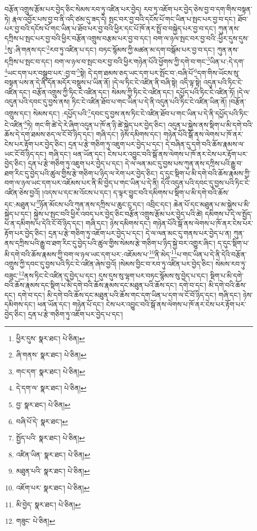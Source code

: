 བརྩོན་འགྲུས་རྩོམ་པར་བྱེད་ཅིང་སེམས་རབ་ཏུ་འཛིན་པར་བྱེད། རབ་ཏུ་འཇོག་པར་བྱེད་ཅེས་བྱ་བ་དག་གིས་བསྟན་ཏེ། རྣལ་འབྱོར་པས་བྱ་བ་ནི་འདི་ཙམ་དུ་ཟད་དེ། སྤང་བར་བྱ་བའི་དངོས་པོ་གང་ཡིན་པ་སྤང་པར་བྱ་བ་དང་། ཐོབ་པར་བྱ་བའི་དངོས་པོ་གང་ཡིན་པ་ཐོབ་པར་བྱ་བའི་ཕྱིར་དང་པོ་ཁོ་ནར་སྤྲོ་བ་བསྐྱེད་པར་བྱ་བ་དང་། ཀུན་ནས་དཀྲིས་པ་སྤང་པར་བྱ་བའི་ཕྱིར་བརྩོན་འགྲུས་བརྩམ་པར་བྱ་བ་དང་། བག་ལ་ཉལ་སྤང་བར་བྱ་བའི་:ཕྱིར་དུས་དུས་\footnote{ཕྱིར་དུས་  སྣར་ཐང་།  པེ་ཅིན། }སུ་:ཞི་གནས་དང་\footnote{ཞི་གནས་  སྣར་ཐང་།  པེ་ཅིན། }རབ་ཏུ་འཛིན་པ་དང་། བཏང་སྙོམས་ཀྱི་མཚན་མ་དག་བསྒོམ་པར་བྱ་བ་དང་། ཀུན་ནས་དཀྲིས་པ་སྤང་བ་དང་། བག་ལ་ཉལ་བ་སྤང་བར་བྱ་བའི་ཕྱིར་གཉེན་པོའི་ཕྱོགས་ཀྱི་དགེ་བ་གང་\footnote{གང་དག་  སྣར་ཐང་།  པེ་ཅིན། }ཡིན་པ་:དེ་དག་\footnote{དེ་དག་ལ་  སྣར་ཐང་།  པེ་ཅིན། }ཡང་དག་པར་བསྒྲུབ་པར་:བྱ་བ་\footnote{བྱ་  སྣར་ཐང་།  པེ་ཅིན། }སྟེ། དེ་དག་ཐམས་ཅད་ཡང་དག་པར་སྤོང་བ་:བཞི་པོ་\footnote{བཞི་པོ་དེ་  སྣར་ཐང་། }དག་གིས་ཡོངས་སུ་བསྟན་པས་ན་དེ་ནི་དོན་མདོར་བསྡུས་པ་ཡིན་ནོ། །དེ་ལ་ཏིང་ངེ་འཛིན་ནི་བཞི་སྟེ། འདི་ལྟ་སྟེ། འདུན་པའི་ཏིང་ངེ་འཛིན་དང་། བརྩོན་འགྲུས་ཀྱི་ཏིང་ངེ་འཛིན་དང་། སེམས་ཀྱི་ཏིང་ངེ་འཛིན་དང་། དཔྱོད་པའི་ཏིང་ངེ་འཛིན་ཏོ། །དེ་ལ་འདུན་པའི་དབང་དུ་བྱས་ནས། ཏིང་ངེ་འཛིན་ཐོབ་པ་གང་ཡིན་པ་དེ་ནི་འདུན་པའི་ཏིང་ངེ་འཛིན་ཡིན་ནོ། །བརྩོན་འགྲུས་དང་། སེམས་དང་། :དཔྱོད་པའི་\footnote{སྤྱོད་པའི་  སྣར་ཐང་།  པེ་ཅིན། }དབང་དུ་བྱས་ནས་ཏིང་ངེ་འཛིན་ཐོབ་པ་གང་ཡིན་པ་དེ་ནི་དཔྱོད་པའི་ཏིང་ངེ་འཛིན་\footnote{འཛིན་ཡིན་  སྣར་ཐང་།  པེ་ཅིན། }ཏེ། གང་གི་ཚེ་དེ་རེ་ཞིག་འདུན་པ་ཁོ་ན་ཉི་ཚེ་སྐྱེད་པར་བྱེད་ཅིང་། འདུན་པ་སྐྱེས་ནས་སྡིག་པ་མི་དགེ་བའི་ཆོས་དེ་དག་ཐམས་ཅད་ལ་ངོ་བོ་ཉིད་དང་། གཞི་དང་། ཉེས་དམིགས་དང་། གཉེན་པོའི་སྒོ་ནས་ལེགས་པ་ཁོ་ནར་ངེས་པར་རྟོག་པར་བྱེད་ཅིང་། དྲན་པ་རྩེ་གཅིག་ཏུ་འཇུག་པར་བྱེད་པ་དང་། དེ་བཞིན་དུ་དགེ་བའི་ཆོས་རྣམས་ལ་ཡང་ངོ་བོ་ཉིད་དང་། གཞི་དང་། ཕན་ཡོན་དང་། ངེས་པར་འབྱུང་བའི་སྒོ་ནས་ལེགས་པ་ཁོ་ནར་ངེས་པར་རྟོག་པར་བྱེད་ཅིང་། དྲན་པ་རྩེ་གཅིག་ཏུ་འཇུག་པར་བྱེད་པ་དང་། དེ་ལ་ལན་མང་དུ་བྱས་པས་ཀུན་ནས་དཀྲིས་པའི་རྒྱུ་བ་ཐག་རིང་དུ་བྱེད་པའི་ཚུལ་གྱིས་རྩེ་གཅིག་པ་ཉིད་ལ་རེག་པར་བྱེད་ཅིང་། ད་དུང་སྡིག་པ་མི་དགེ་བའི་ཆོས་རྣམས་ཀྱི་བག་ལ་ཉལ་ཡང་དག་པར་འཇོམས་པར་ནི་མི་བྱེད་པ་གང་ཡིན་པ་དེ་ནི། དེའི་འདུན་པའི་དབང་དུ་བྱས་པའི་ཏིང་ངེ་འཛིན་ཅེས་བྱའོ། །འདས་པ་དང་མ་འོངས་པ་དང་། ད་ལྟར་བྱུང་བའི་དམིགས་པ་སྡིག་པ་མི་དགེ་བའི་ཆོས་དང་:མཐུན་པ་\footnote{མཐུན་པའི་  སྣར་ཐང་།  པེ་ཅིན། }ཉོན་མོངས་པའི་ཀུན་ནས་དཀྲིས་པ་ཆུང་ངུ་དང་། འབྲིང་དང་། ཆེན་པོ་དང་མཐུན་པ་མ་སྐྱེས་པ་མི་སྐྱེད་པ་དང་། སྐྱེས་པ་སྤང་བའི་ཕྱིར་འབད་པར་བྱེད་ཅིང་བརྩོན་འགྲུས་རྩོམ་པར་བྱེད་པའི་ཚེ། དམིགས་པ་དེ་ལ་སྤྱོད་པ་ན་དམིགས་པ་དེའི་ངོ་བོ་ཉིད་དང་། གཞི་དང་། ཉེས་དམིགས་དང་། གཉེན་པོའི་སྒོ་ནས་ལེགས་པ་ཁོ་ནར་ངེས་པར་རྟོག་པར་བྱེད་ཅིང་། དྲན་པ་རྩེ་གཅིག་ཏུ་འཇོག་པར་བྱེད་པ་དང་། དེ་ལ་ལན་མང་དུ་གནས་པར་བྱེད་པ་ན། ཀུན་ནས་དཀྲིས་པའི་རྒྱུ་བ་ཐག་རིང་དུ་བྱེད་པའི་ཚུལ་གྱིས་སེམས་རྩེ་གཅིག་པ་ཉིད་སྐྱེ་བར་འགྱུར་ཞིང་། ད་དུང་སྡིག་པ་མི་དགེ་བའི་ཆོས་རྣམས་ཀྱི་བག་ལ་ཉལ་ཡང་དག་པར་:འཇོམས་པ་\footnote{འཇོག་པར་  སྣར་ཐང་།  པེ་ཅིན། }ནི་མེད་\footnote{མི་བྱེད་  སྣར་ཐང་།  པེ་ཅིན། }པ་གང་ཡིན་པ་དེ་ནི་དེའི་བརྩོན་འགྲུས་ཀྱི་དབང་དུ་བྱས་པའི་ཏིང་ངེ་འཛིན་ཞེས་བྱའོ། །སེམས་བྱིང་བ་རབ་ཏུ་འཛིན་པར་བྱེད་ཅིང་། སེམས་རབ་ཏུ་བཟུང་\footnote{གཟུང་  པེ་ཅིན། }ནས་ཏིང་ངེ་འཛིན་དུ་བྱེད་པ་དང་། དུས་དུས་སུ་ལྷག་པར་བཏང་སྙོམས་སུ་བྱེད་པ་དང་། སྡིག་པ་མི་དགེ་བའི་ཆོས་རྣམས་དང་སྡིག་པ་མི་དགེ་བའི་ཆོས་རྣམས་དང་མཐུན་པའི་ཆོས་དང་། དགེ་བ་དང་། མི་དགེ་བའི་ཆོས་དང་། དགེ་བ་དང་། མི་དགེ་བའི་ཆོས་དང་མཐུན་པའི་ཆོས་གང་དག་ཡིན་པ་དག་ལ་ངོ་བོ་ཉིད་དང་། གཞི་དང་། ཉེས་དམིགས་དང་། ཕན་ཡོན་དང་། གཉེན་པོ་དང་། ངེས་པར་འབྱུང་བའི་སྒོ་ནས་ལེགས་པ་ཁོ་ནར་ངེས་པར་རྟོག་པར་བྱེད་ཅིང་། དྲན་པ་རྩེ་གཅིག་ཏུ་འཇོག་པར་བྱེད་པ་དང་། 